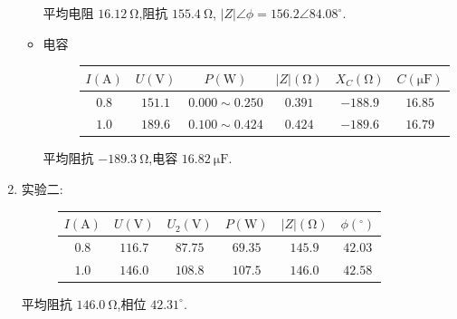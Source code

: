 \begin{enumerate}
\begin{itemize}
                    平均电阻 $16.12 \ \mathrm{\Omega}$,阻抗 $155.4 \ \mathrm{\Omega}$, $|Z|\angle\phi=156.2\angle 84.08^{\circ}$.
                \item 电容
                    \begin{figure}[htbp]
                        \centering
                        \begin{tabular}{c|c|c|c|c|c}
                            $I\left( \mathrm{A} \right) $ & $U\left( \mathrm{V} \right) $ & $P\left( \mathrm{W} \right) $ & $|Z|\left( \mathrm{\Omega} \right) $ & $X_{C}\left( \mathrm{\Omega} \right) $ & $C\left( \mathrm{\mu F} \right) $ \\\hline
                            $0.8$ & $151.1$ & $0.000\sim{}0.250$ & $0.391$ & $-188.9$ & $16.85$ \\\hline
                            $1.0$ & $189.6$ & $0.100\sim{}0.424$ & $0.424$ & $-189.6$ & $16.79$
                        \end{tabular}
                    \end{figure}

                    平均阻抗 $-189.3 \ \mathrm{\Omega}$,电容 $16.82 \ \mathrm{\mu F}$.
            \end{itemize}
        \item 实验二:
            \begin{figure}[h!]
                \centering
                \begin{tabular}{c|c|c|c|c|c}
                            $I\left( \mathrm{A} \right) $ & $U\left( \mathrm{V} \right) $ & $U_2\left( \mathrm{V} \right) $ & $P\left( \mathrm{W} \right) $ & $|Z|\left( \mathrm{\Omega} \right) $ & $\phi\left( \mathrm{^{\circ}} \right) $ \\\hline
                    $0.8$ & $116.7$ & $87.75$ & $69.35$ & $145.9$ & $42.03$ \\\hline
                    $1.0$ & $146.0$ & $108.8$ & $107.5$ & $146.0$ & $42.58$
                \end{tabular}
            \end{figure}

            平均阻抗 $146.0 \ \mathrm{\Omega}$,相位 $42.31^{\circ}$.
    \end{enumerate}
    \newpage
